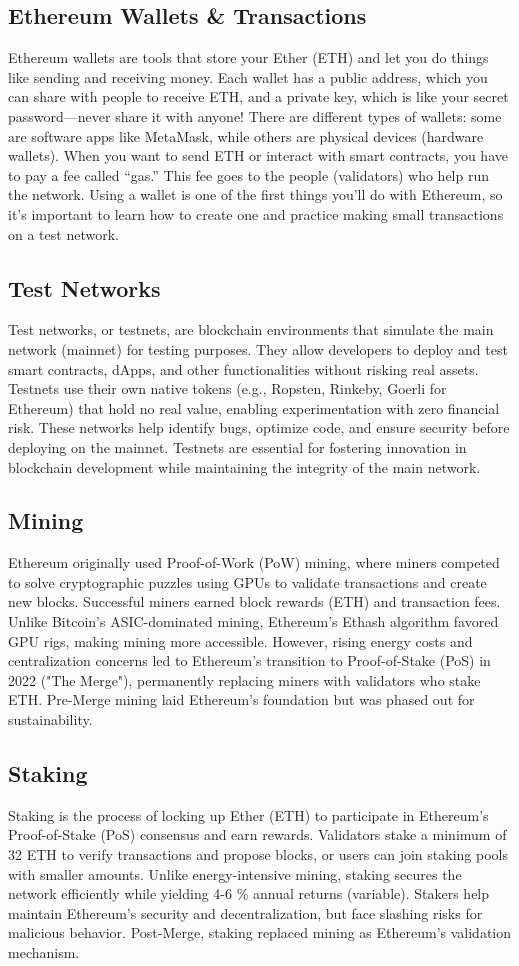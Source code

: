 \documentclass[12pt, a4paper]{article}
\begin{document}
\subsection{Ethereum Wallets \& Transactions}
Ethereum wallets are tools that store your Ether (ETH) and let you do things like sending and receiving money. Each wallet has a public address, which you can share with people to receive ETH, and a private key, which is like your secret password—never share it with anyone! There are different types of wallets: some are software apps like MetaMask, while others are physical devices (hardware wallets). When you want to send ETH or interact with smart contracts, you have to pay a fee called “gas.” This fee goes to the people (validators) who help run the network. Using a wallet is one of the first things you’ll do with Ethereum, so it’s important to learn how to create one and practice making small transactions on a test network.
\subsection{Test Networks}
Test networks, or testnets, are blockchain environments that simulate the main network (mainnet) for testing purposes. They allow developers to deploy and test smart contracts, dApps, and other functionalities without risking real assets. Testnets use their own native tokens (e.g., Ropsten, Rinkeby, Goerli for Ethereum) that hold no real value, enabling experimentation with zero financial risk. These networks help identify bugs, optimize code, and ensure security before deploying on the mainnet. Testnets are essential for fostering innovation in blockchain development while maintaining the integrity of the main network.
\subsection{Mining}
Ethereum originally used Proof-of-Work (PoW) mining, where miners competed to solve cryptographic puzzles using GPUs to validate transactions and create new blocks. Successful miners earned block rewards (ETH) and transaction fees. Unlike Bitcoin's ASIC-dominated mining, Ethereum's Ethash algorithm favored GPU rigs, making mining more accessible. However, rising energy costs and centralization concerns led to Ethereum's transition to Proof-of-Stake (PoS) in 2022 ("The Merge"), permanently replacing miners with validators who stake ETH. Pre-Merge mining laid Ethereum's foundation but was phased out for sustainability.
\subsection{Staking}
Staking is the process of locking up Ether (ETH) to participate in Ethereum's Proof-of-Stake (PoS) consensus and earn rewards. Validators stake a minimum of 32 ETH to verify transactions and propose blocks, or users can join staking pools with smaller amounts. Unlike energy-intensive mining, staking secures the network efficiently while yielding 4-6 \% annual returns (variable). Stakers help maintain Ethereum's security and decentralization, but face slashing risks for malicious behavior. Post-Merge, staking replaced mining as Ethereum's validation mechanism.
\end{document}
